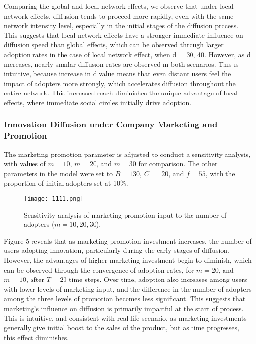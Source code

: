 \documentclass{article} %
\begin{document}
Comparing the global and local network effects, we observe that under local network effects, diffusion tends to proceed more rapidly, even with the same network intensity level, especially in the initial stages of the diffusion process. This suggests that local network effects have a stronger immediate influence on diffusion speed than global effects, which can be observed through larger adoption rates in the case of local network effect, when d = 30, 40. However, as d increases, nearly similar diffusion rates are observed in both scenarios. This is intuitive, because increase in d value means that even distant users feel the impact of adopters more strongly, which accelerates diffusion throughout the entire network. This increased reach diminishes the unique advantage of local effects, where immediate social circles initially drive adoption. 

\subsubsection{Innovation Diffusion under Company Marketing and Promotion}
The marketing promotion parameter is adjusted to conduct a sensitivity analysis, with values of \( m = 10 \), \( m = 20 \), and \( m = 30 \) for comparison. The other parameters in the model were set to \( B = 130 \), \( C = 120 \), and \( f = 55 \), with the proportion of initial adopters set at 10\%. 
\begin{figure}[h]
    \centering
    \texttt{[image: 1111.png]} %
    \caption{Sensitivity analysis of marketing promotion input to the number of adopters (\( m = 10, 20, 30 \)).}
    \label{fig:marketing_promotion_sensitivity}
\end{figure}
Figure 5 reveals that as marketing promotion investment increases, the number of users adopting innovation, particularly during the early stages of diffusion. However, the advantages of higher marketing investment begin to diminish, which can be observed through the convergence of adoption rates, for \(m = 20\), and \(m = 10\), after \(T = 20\) time steps. Over time, adoption also increases among users with lower levels of marketing input, and the difference in the number of adopters among the three levels of promotion becomes less significant. This suggests that marketing’s influence on diffusion is primarily impactful at the start of process. This is intuitive, and consistent with real-life scenario, as marketing investments generally give initial boost to the sales of the product, but as time progresses, this effect diminishes. 
\end{document}
